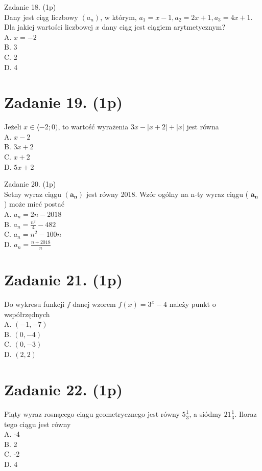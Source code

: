 \documentclass[10pt]{article}
\begin{document}
Zadanie 18. (1p)\\
Dany jest ciąg liczbowy \(\left(a_{n}\right)\), w którym, \(a_{1}=x-1, a_{2}=2 x+1, a_{3}=4 x+1\).\\
Dla jakiej wartości liczbowej \(x\) dany ciąg jest ciągiem arytmetycznym?\\
A. \(x=-2\)\\
B. 3\\
C. 2\\
D. 4

\section*{Zadanie 19. (1p)}
Jeżeli \(x \in\langle-2 ; 0)\), to wartość wyrażenia \(3 x-|x+2|+|x|\) jest równa\\
A. \(x-2\)\\
B. \(3 x+2\)\\
C. \(x+2\)\\
D. \(5 x+2\)

Zadanie 20. (1p)\\
Setny wyraz ciągu \(\left(\boldsymbol{a}_{\boldsymbol{n}}\right)\) jest równy 2018. Wzór ogólny na n-ty wyraz ciągu ( \(\boldsymbol{a}_{\boldsymbol{n}}\) ) może mieć postać\\
A. \(a_{n}=2 n-2018\)\\
B. \(a_{n}=\frac{n^{2}}{4}-482\)\\
C. \(a_{n}=n^{2}-100 n\)\\
D. \(a_{n}=\frac{n+2018}{n}\)

\section*{Zadanie 21. (1p)}
Do wykresu funkcji \(f\) danej wzorem \(f(x)=3^{x}-4\) należy punkt o współrzędnych\\
A. \((-1,-7)\)\\
B. \((0,-4)\)\\
C. \((0,-3)\)\\
D. \((2,2)\)

\section*{Zadanie 22. (1p)}
Piąty wyraz rosnącego ciągu geometrycznego jest równy \(5 \frac{1}{3}\), a siódmy \(21 \frac{1}{3}\). Iloraz tego ciągu jest równy\\
A. -4\\
B. 2\\
C. -2\\
D. 4
\end{document}
